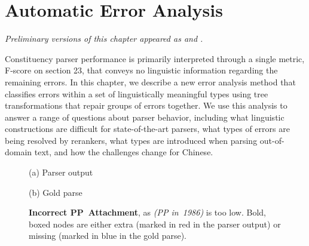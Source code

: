 \chapter{Automatic Error Analysis} \label{chp:analysis}

\begin{center}
\textit{
  Preliminary versions of this chapter appeared as \textcite{Kummerfeld-etal:2012:EMNLP} and \textcite{Kummerfeld-etal:2013:ACL}.
}
\end{center}

Constituency parser performance is primarily interpreted through a single metric, F-score on \wsj section 23, that conveys no linguistic information regarding the remaining errors.
In this chapter, we describe a new error analysis method that classifies errors within a set of linguistically meaningful types using tree transformations that repair groups of errors together.
We use this analysis to answer a range of questions about parser behavior, including what linguistic constructions are difficult for state-of-the-art parsers, what types of errors are being resolved by rerankers, what types are introduced when parsing out-of-domain text, and how the challenges change for Chinese.


\begin{figure}
\begin{center}

(a) Parser output
\vspace{3mm}


(b) Gold parse
\end{center}
\derivspace
\caption[Error analysis example: PP Attachment.]{ \label{fig:PP-attachment}
	\textbf{Incorrect PP~Attachment}, as \emph{(PP in~1986)} is too low.
	Bold, boxed nodes are either extra (marked in red in the parser output) or missing (marked in blue in the gold parse).
}
\derivaftercompress
\end{figure}

